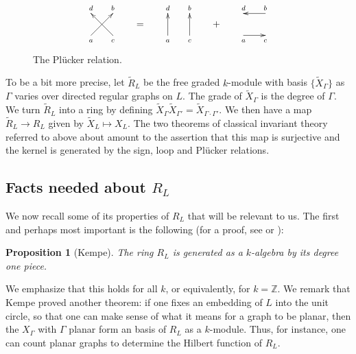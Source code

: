 \documentclass{amsart}
\newtheorem{proposition}[theorem]{Proposition}
\theoremstyle{definition}
\theoremstyle{remark}
\def\Z{\mathbb{Z}}
\def\wt{\mathbf{wt}}
\let\ss\scriptstyle
\let\wt\widetilde
\begin{document}
\begin{figure}
\begin{displaymath}
\begin{xy}
(0, -6)*{\ss a}; (0, 6)*{\ss d}; (8, -6)*{\ss c}; (8, 6)*{\ss b};
(0, -4)*{}="A"; (0, 4)*{}="B"; (8, -4)*{}="C"; (8, 4)*{}="D";
{\ar "A"; "D"}; {\ar "C"; "B"};
\end{xy}
\qquad = \qquad
\begin{xy}
(0, -6)*{\ss a}; (0, 6)*{\ss d}; (8, -6)*{\ss c}; (8, 6)*{\ss b};
(0, -4)*{}="A"; (0, 4)*{}="B"; (8, -4)*{}="C"; (8, 4)*{}="D";
{\ar "A"; "B"}; {\ar "C"; "D"};
\end{xy}
\qquad + \qquad
\begin{xy}
(0, -6)*{\ss a}; (0, 6)*{\ss d}; (8, -6)*{\ss c}; (8, 6)*{\ss b};
(0, -4)*{}="A"; (0, 4)*{}="B"; (8, -4)*{}="C"; (8, 4)*{}="D";
{\ar "A"; "C"}; {\ar "D"; "B"};
\end{xy}
\end{displaymath}
\caption{The Pl\"ucker relation.}
\label{fig:pluck}
\end{figure}

To be a bit more precise, let $\wt{R}_L$ be the free graded $k$-module with
basis $\{ \wt{X}_{\Gamma} \}$ as $\Gamma$ varies over directed regular graphs
on $L$.  The grade of $\wt{X}_{\Gamma}$ is the degree of $\Gamma$.  We turn
$\wt{R}_L$ into a ring by defining $\wt{X}_{\Gamma} \wt{X}_{\Gamma'}=
\wt{X}_{\Gamma \cdot \Gamma'}$.  We then have a map $\wt{R}_L \to R_L$ given
by $\wt{X}_L \mapsto X_L$.  The two theorems of classical invariant theory
referred to above about amount to the assertion that this map is surjective
and the kernel is generated by the sign, loop and Pl\"ucker relations.


\subsection{Facts needed about $R_L$}

We now recall some of its properties of $R_L$ that will be
relevant to us.  The first and perhaps most important is the
following (for a proof, see \cite{HMSV} or  \cite{hmsv1}):

\begin{proposition}[Kempe]
The ring $R_L$ is generated as a $k$-algebra by its degree one piece.
\end{proposition}

We emphasize that this holds for all $k$, or equivalently, for $k=\Z$.
We remark that Kempe proved another theorem:  if one fixes an embedding of
$L$ into the unit circle, so that one can make sense of what it means for
a graph to be planar, then the $X_{\Gamma}$ with $\Gamma$ planar form an
basis of $R_L$ as a $k$-module.  Thus, for instance, one can count planar
graphs to determine the Hilbert function of $R_L$.
\end{document}
